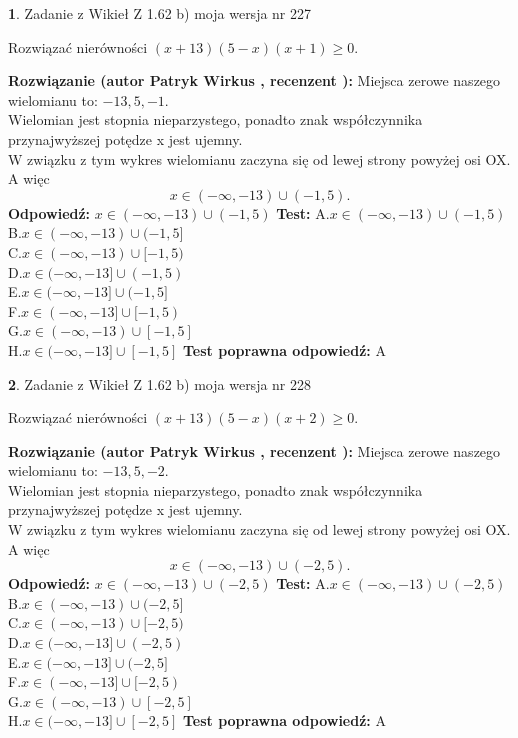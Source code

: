 \documentclass[12pt, a4paper]{article}
\theoremstyle{definition} %
\newtheorem{zad}{}
\newcommand{\zadStart}[1]{\begin{zad}#1\newline}
\newcommand{\zadStop}{\end{zad}}
\newcommand{\rozwStart}[2]{\noindent \textbf{Rozwiązanie (autor #1 , recenzent #2): }\newline}
\newcommand{\rozwStop}{\newline}
\newcommand{\odpStart}{\noindent \textbf{Odpowiedź:}\newline}
\newcommand{\odpStop}{\newline}
\newcommand{\testStart}{\noindent \textbf{Test:}\newline}
\newcommand{\testStop}{\newline}
\newcommand{\kluczStart}{\noindent \textbf{Test poprawna odpowiedź:}\newline}
\newcommand{\kluczStop}{\newline}
\begin{document}
\zadStart{Zadanie z Wikieł Z 1.62 b) moja wersja nr 227}

Rozwiązać nierówności $(x+13)(5-x)(x+1)\ge0$.
\zadStop
\rozwStart{Patryk Wirkus}{}
Miejsca zerowe naszego wielomianu to: $-13, 5, -1$.\\
Wielomian jest stopnia nieparzystego, ponadto znak współczynnika przy\linebreak najwyższej potędze x jest ujemny.\\ W związku z tym wykres wielomianu zaczyna się od lewej strony powyżej osi OX. A więc $$x \in (-\infty,-13) \cup (-1,5).$$
\rozwStop
\odpStart
$x \in (-\infty,-13) \cup (-1,5)$
\odpStop
\testStart
A.$x \in (-\infty,-13) \cup (-1,5)$\\
B.$x \in (-\infty,-13) \cup (-1,5]$\\
C.$x \in (-\infty,-13) \cup [-1,5)$\\
D.$x \in (-\infty,-13] \cup (-1,5)$\\
E.$x \in (-\infty,-13] \cup (-1,5]$\\
F.$x \in (-\infty,-13] \cup [-1,5)$\\
G.$x \in (-\infty,-13) \cup [-1,5]$\\
H.$x \in (-\infty,-13] \cup [-1,5]$
\testStop
\kluczStart
A
\kluczStop



\zadStart{Zadanie z Wikieł Z 1.62 b) moja wersja nr 228}

Rozwiązać nierówności $(x+13)(5-x)(x+2)\ge0$.
\zadStop
\rozwStart{Patryk Wirkus}{}
Miejsca zerowe naszego wielomianu to: $-13, 5, -2$.\\
Wielomian jest stopnia nieparzystego, ponadto znak współczynnika przy\linebreak najwyższej potędze x jest ujemny.\\ W związku z tym wykres wielomianu zaczyna się od lewej strony powyżej osi OX. A więc $$x \in (-\infty,-13) \cup (-2,5).$$
\rozwStop
\odpStart
$x \in (-\infty,-13) \cup (-2,5)$
\odpStop
\testStart
A.$x \in (-\infty,-13) \cup (-2,5)$\\
B.$x \in (-\infty,-13) \cup (-2,5]$\\
C.$x \in (-\infty,-13) \cup [-2,5)$\\
D.$x \in (-\infty,-13] \cup (-2,5)$\\
E.$x \in (-\infty,-13] \cup (-2,5]$\\
F.$x \in (-\infty,-13] \cup [-2,5)$\\
G.$x \in (-\infty,-13) \cup [-2,5]$\\
H.$x \in (-\infty,-13] \cup [-2,5]$
\testStop
\kluczStart
A
\kluczStop
\end{document}
